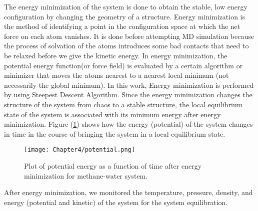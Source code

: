 The energy minimization of the system is done to obtain the stable, low energy configuration by changing the geometry of a structure. Energy minimization is the method of identifying a point in the configuration space at which the net force on each atom vanishes. It is done before attempting MD simulation because the process of solvation of the atoms introduces some bad contacts that need to be relaxed before we give the kinetic energy. In energy minimization, the potential energy function(or force field) is evaluated by a certain algorithm or minimizer that moves the atoms nearest to a
nearest local minimum (not necessarily the global minimum). In this work,  Energy minimization is  performed   by using Steepest Descent Algorithm. Since the energy minimization changes the structure of the system from chaos to a stable structure, the local equilibrium state of the system is associated with its minimum energy after energy minimization. Figure (\ref{methane-water}) shows how the energy (potential) of the system changes in time in the course of bringing the system in a local equilibrium state. 
\begin{figure}[h!]
\centering
\texttt{[image: Chapter4/potential.png]}
\caption[Potential energy plot after Energy minimization.]{Plot of potential energy as a function of time after energy minimization for methane-water system.}
\label{methane-water}
\end{figure} 
 After energy minimization, we monitored the temperature, pressure, density, and energy (potential and kinetic) of the system for the system equilibration. 
 
